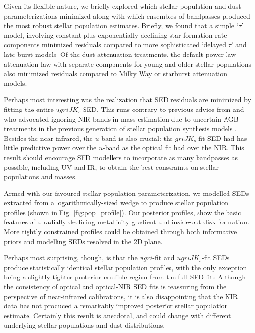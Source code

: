 \documentclass{iau}
\begin{document}
Given its flexible nature, we briefly explored which stellar population and dust parameterizations minimized along with which ensembles of bandpasses produced the most robust stellar population estimates.
Briefly, we found that a simple `$\tau$' model, involving constant plus exponentially declining star formation rate components minimized residuals compared to more sophisticated `delayed $\tau$' and late burst models.
Of the dust attenuation treatments, the default power-law attenuation law with separate components for young and older stellar populations also minimized residuals compared to Milky Way or starburst attenuation models.

Perhaps most interesting was the realization that SED residuals are minimized by fitting the entire $ugriJK_s$ SED.
This runs contrary to previous advice from \cite{Taylor:2011} and \cite{Zibetti:2009} who advocated ignoring NIR bands in mass estimation due to uncertain AGB treatments in the previous generation of stellar population synthesis models \citep[e.g.][]{Bruzual:2003,Maraston:2005}.
Besides the near-infrared, the $u$-band is also crucial: the $griJK_s$-fit SED had has little predictive power over the $u$-band as the optical fit had over the NIR.
This result should encourage SED modellers to incorporate as many bandpasses as possible, including UV and IR, to obtain the best constraints on stellar populations and masses.

Armed with our favoured stellar population parameterization, we modelled SEDs extracted from a logarithmically-sized wedge \citep[e.g.][their Fig. 2]{Courteau:2011} to produce stellar population profiles (shown in Fig. \ref{fig:pop_profile}).
Our posterior profiles, show the basic features of a radially declining metallicity gradient and inside-out disk formation.
More tightly constrained profiles could be obtained through both informative priors and modelling SEDs resolved in the 2D plane.

Perhaps most surprising, though, is that the $ugri$-fit and $ugriJK_s$-fit SEDs produce statistically identical stellar population profiles, with the only exception being a slightly tighter posterior credible region from the full-SED fits
Although the consistency of optical and optical-NIR SED fits is reassuring from the perspective of near-infrared calibrations, it is also disappointing that the NIR data has not produced a remarkably improved posterior stellar population estimate.
Certainly this result is anecdotal, and could change with different underlying stellar populations and dust distributions.
\end{document}
